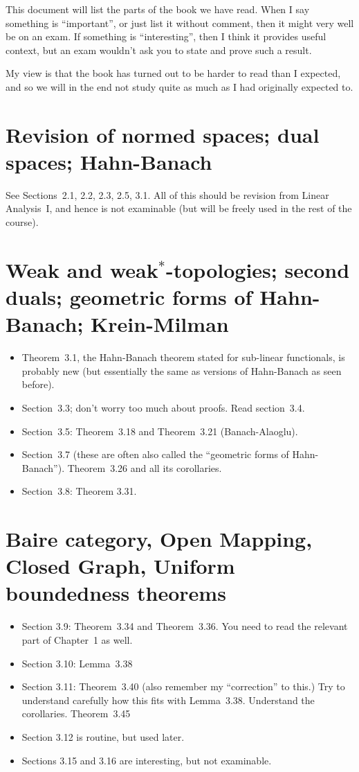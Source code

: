\documentclass[twoside,12pt,a4paper]{article}
\begin{document}
\bigskip

This document will list the parts of the book we have read.  When I say
something is ``important'', or just list it without comment,
then it might very well be on an exam.  If something is ``interesting'',
then I think it provides useful context, but an exam wouldn't ask you to
state and prove such a result.

My view is that the book has turned out to be harder to read than I expected,
and so we will in the end not study quite as much as I had originally
expected to.

\section{Revision of normed spaces; dual spaces; Hahn-Banach}

See Sections~2.1, 2.2, 2.3, 2.5, 3.1.  All of this should be revision from
Linear Analysis~I, and hence is not examinable (but will be freely used
in the rest of the course).


\section{Weak and weak$^*$-topologies; second duals; geometric forms of
Hahn-Banach; Krein-Milman}

\begin{itemize}
\item Theorem~3.1, the Hahn-Banach theorem stated for sub-linear functionals,
is probably new (but essentially the same as versions of Hahn-Banach as
seen before).
\item Section~3.3; don't worry too much about proofs.  Read section~3.4.
\item Section~3.5: Theorem~3.18 and Theorem~3.21
(Banach-Alaoglu).
\item Section~3.7 (these are often also called the ``geometric forms of
Hahn-Banach'').  Theorem~3.26 and all its corollaries.
\item Section~3.8: Theorem 3.31.
\end{itemize}


\section{Baire category, Open Mapping, Closed Graph, Uniform boundedness
theorems}

\begin{itemize}
\item Section 3.9: Theorem~3.34 and Theorem~3.36.  You need to read the
relevant part of Chapter~1 as well.
\item Section 3.10: Lemma~3.38
\item Section 3.11: Theorem~3.40 (also remember my ``correction'' to this.)
Try to understand carefully how this fits with Lemma~3.38.  Understand
the corollaries.  Theorem~3.45
\item Section 3.12 is routine, but used later.
\item Sections 3.15 and 3.16 are interesting, but not examinable.
\end{itemize}
\end{document}
